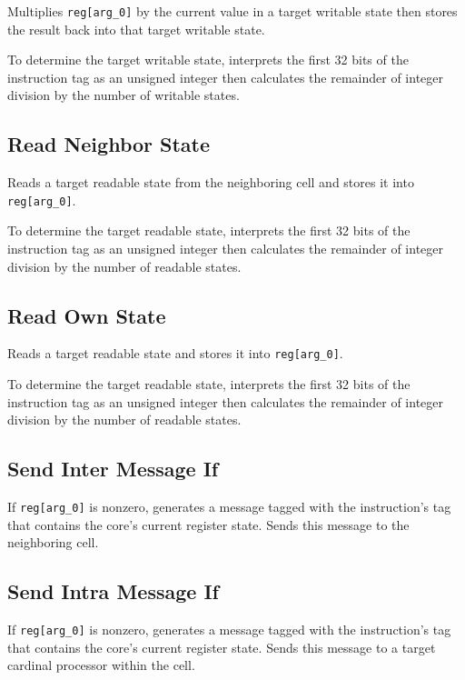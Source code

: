 
Multiplies \texttt{reg[arg\_0]} by the current value in a target writable state then stores the result back into that target writable state.

To determine the target writable state, interprets the first 32 bits of the instruction tag as an unsigned integer then calculates the remainder of integer division by the number of writable states.

\subsection{Read Neighbor State}


Reads a target readable state from the neighboring cell and stores it into \texttt{reg[arg\_0]}.

To determine the target readable state, interprets the first 32 bits of the instruction tag as an unsigned integer then calculates the remainder of integer division by the number of readable states.

\subsection{Read Own State}


Reads a target readable state and stores it into \texttt{reg[arg\_0]}.

To determine the target readable state, interprets the first 32 bits of the instruction tag as an unsigned integer then calculates the remainder of integer division by the number of readable states.

\subsection{Send Inter Message If}


If \texttt{reg[arg\_0]} is nonzero, generates a message tagged with the instruction's tag that contains the core's current register state.
Sends this message to the neighboring cell.

\subsection{Send Intra Message If}


If \texttt{reg[arg\_0]} is nonzero, generates a message tagged with the instruction's tag that contains the core's current register state.
Sends this message to a target cardinal processor within the cell.

